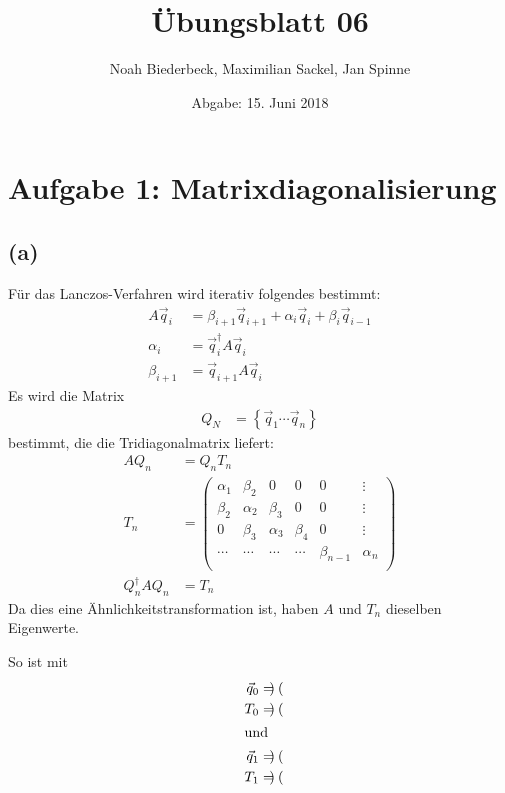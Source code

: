 \documentclass{scrartcl}
\title{Übungsblatt 06}
\author{%
		Noah Biederbeck, Maximilian Sackel, Jan Spinne
}
\date{Abgabe: 15. Juni 2018}
\begin{document}
\maketitle
\section*{Aufgabe 1: Matrixdiagonalisierung}
\subsection*{(a)}
Für das Lanczos-Verfahren wird iterativ folgendes bestimmt:
\begin{align}
		A \vec{q}_{i} &= \beta_{i+1} \vec{q}_{i+1} + \alpha_{i} \vec{q}_{i} + \beta_{i} \vec{q}_{i-1} \\
		\alpha_{i} &= \vec{q}_{i}^{\dagger} A \vec{q}_{i} \\
		\beta_{i+1} &= \vec{q}_{i+1} A \vec{q}_{i}
\end{align}
Es wird die Matrix
\begin{align}
		Q_{N} &= \left\{ \vec{q}_{1} \cdots \vec{q}_{n} \right\}
\end{align}
bestimmt, die die Tridiagonalmatrix liefert:
\begin{align}
		A Q_{n} &= Q_{n} T_{n} \\
		T_{n} &= 
		\left(\begin{matrix}
						\alpha_{1} & \beta_{2}  & 0          & 0         & 0           & \vdots     \\
						\beta_{2}  & \alpha_{2} & \beta_{3}  & 0         & 0           & \vdots     \\
						0          & \beta_{3}  & \alpha_{3} & \beta_{4} & 0           & \vdots     \\
						\cdots     & \cdots     & \cdots     & \cdots    & \beta_{n-1} & \alpha_{_{}n} \\
		\end{matrix}\right) \\
		Q_{n}^{\dagger} A Q_{n} &= T_{n}
\end{align}
Da dies eine Ähnlichkeitstransformation ist, haben $A$ und $T_{n}$ dieselben Eigenwerte.

So ist mit
\begin{align}
		\vec{q}_{0} &= \left(\begin{matrix}\end{matrix}\right) \\
		T_{0} &= \left(\begin{matrix}\end{matrix}\right) \\
		\intertext{und}
		\vec{q}_{1} &= \left(\begin{matrix}\end{matrix}\right) \\
		T_{1} &= \left(\begin{matrix}\end{matrix}\right)
\end{align}
\end{document}
